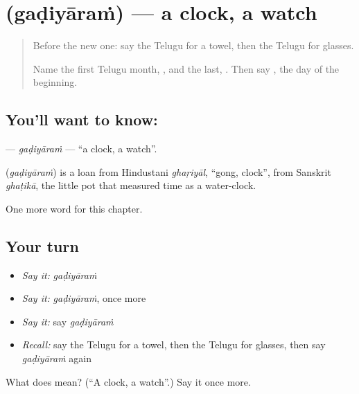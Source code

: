 \section[\texorpdfstring{\te{గడియారం} (gaḍiyāraṁ)}{గడియారం (gaḍiyāraṁ)}]{ (gaḍiyāraṁ) — a clock, a watch}

\label{lesson:TE-C111-gadiyaram}



\begin{quote}
Before the new one: say the Telugu for a towel, then the Telugu for glasses.

Name the first Telugu month, \textbf{}, and the last, \textbf{}. Then say \textbf{}, the day of the beginning.
\end{quote}

\subsection*{You'll want to know: }
\textbf{} — \emph{gaḍiyāraṁ} — \textquotedblleft{}a clock, a watch\textquotedblright{}.

\begin{cousinweb}
\textbf{} (\emph{gaḍiyāraṁ}) is a loan from Hindustani \emph{ghaṛiyāl}, \textquotedblleft{}gong, clock\textquotedblright{}, from Sanskrit \emph{ghaṭikā}, the little pot that measured time as a water-clock.
\end{cousinweb}

\begin{grammarlens}[title={What you've built}]
One more word for this chapter.
\end{grammarlens}

\subsection*{Your turn}
\begin{itemize}
\raggedright
  \item \emph{Say it:} \emph{gaḍiyāraṁ}
  \item \emph{Say it:} \emph{gaḍiyāraṁ}, once more
  \item \emph{Say it:} say \emph{gaḍiyāraṁ}
  \item \emph{Recall:} say the Telugu for a towel, then the Telugu for glasses, then say \emph{gaḍiyāraṁ} again
\end{itemize}

\begin{tcolorbox}[breakable,colback=teal!4,colframe=teal!35!black,title={Before you move on}]
What does  mean? (\textquotedblleft{}A clock, a watch\textquotedblright{}.) Say it once more.
\end{tcolorbox}
